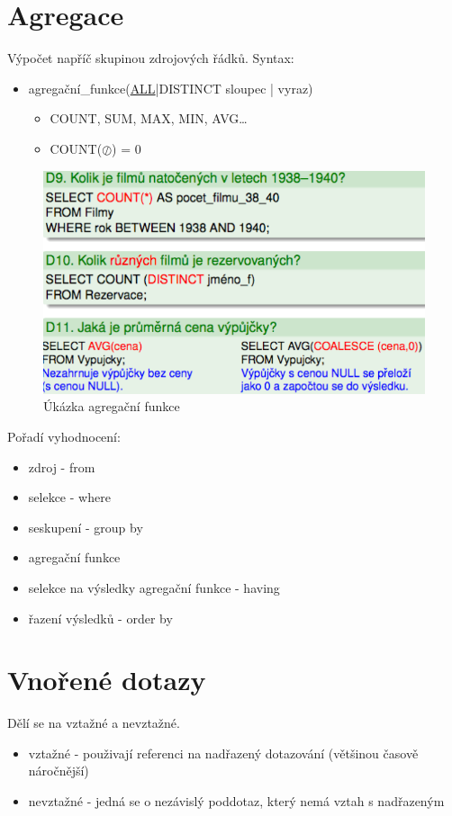 \documentclass{szzclass}
\begin{document}
\tableofcontents
\newpage

\section{Agregace}
Výpočet napříč skupinou zdrojových řádků. Syntax:
\begin{itemize}
    \item agregační\_funkce({\underline{ALL}|DISTINCT} sloupec | vyraz)
    \begin{itemize}
        \item COUNT, SUM, MAX, MIN, AVG\dots
        \item COUNT($\oslash$) = 0
    \end{itemize}
\end{itemize}
\begin{figure}[h!]
    \centering
    \includegraphics[width = 0.8 \textwidth]{topics/bi-wsi-si-04/images/agregation.png}
    \caption{Úkázka agregační funkce}
\end{figure}
Pořadí vyhodnocení:
\begin{itemize}
    \item zdroj - from
    \item selekce - where
    \item seskupení - group by
    \item agregační funkce
    \item selekce na výsledky agregační funkce - having
    \item řazení výsledků - order by
\end{itemize}
\section{Vnořené dotazy}
Dělí se na vztažné a nevztažné.
\begin{itemize}
    \item vztažné - použivají referenci na nadřazený dotazování (většinou časově náročnější)
    \item nevztažné - jedná se o nezávislý poddotaz, který nemá vztah s nadřazeným
\end{itemize}
\end{document}
